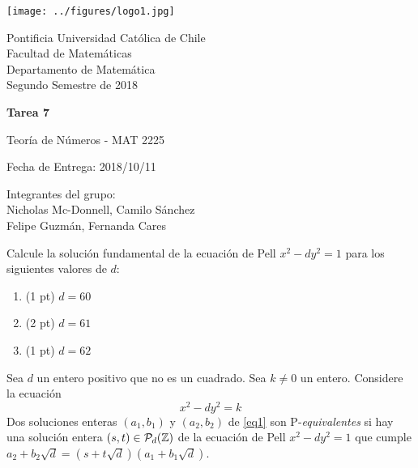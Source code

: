 


\begin{minipage}{2.5cm}
	\texttt{[image: ../figures/logo1.jpg]}
\end{minipage}
\begin{minipage}{13cm}
	\begin{flushleft}
		\raggedright
		{
			\noindent
			{\sc Pontificia Universidad Católica de Chile\\
				Facultad de Matemáticas\\
				Departamento de Matemática} \smallskip \\
			Segundo Semestre de 2018\\
		}
	\end{flushleft}
\end{minipage}

\vspace{2ex}
{\Large \centerline{\bf Tarea 7}}
{\large \centerline{Teoría de Números - MAT 2225}}
\centerline{Fecha de Entrega: 2018/10/11}

\begin{flushright}
	Integrantes del grupo:\\
	Nicholas Mc-Donnell, Camilo Sánchez\\
	Felipe Guzmán, Fernanda Cares
\end{flushright}

\begin{prob}[4 pts]
    Calcule la solución fundamental de la ecuación de Pell $x^2-dy^2=1$ para los siguientes valores de $d$:
    \begin{enumerate}[label = (\roman*)]
        \item (1 pt) $d=60$

        \item (2 pt) $d=61$

        \item (1 pt) $d=62$
    \end{enumerate}
\end{prob}

\begin{sol}
    
\end{sol}

\begin{prob}[2 pts. c/u]
    Sea $d$ un entero positivo que no es un cuadrado. Sea $k\neq0$ un entero. Considere la ecuación
    \begin{equation}
        x^2-dy^2=k\label{eq1}
    \end{equation}
    Dos soluciones enteras $(a_1,b_1)$ y $(a_2,b_2)$ de \eqref{eq1} son P-\textit{equivalentes} si hay una solución entera $(s,t)\in\mathcal{P}_d(\mathbb{Z})$ de la ecuación de Pell $x^2-dy^2=1$ que cumple $a_2+b_2\sqrt{d}=(s+t\sqrt{d})(a_1+b_1\sqrt{d})$.
\end{prob}

